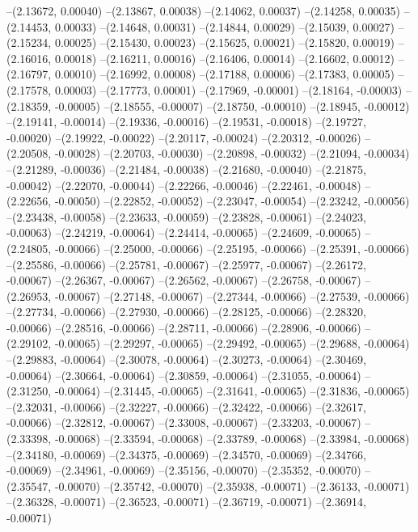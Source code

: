 --(2.13672, 0.00040)
--(2.13867, 0.00038)
--(2.14062, 0.00037)
--(2.14258, 0.00035)
--(2.14453, 0.00033)
--(2.14648, 0.00031)
--(2.14844, 0.00029)
--(2.15039, 0.00027)
--(2.15234, 0.00025)
--(2.15430, 0.00023)
--(2.15625, 0.00021)
--(2.15820, 0.00019)
--(2.16016, 0.00018)
--(2.16211, 0.00016)
--(2.16406, 0.00014)
--(2.16602, 0.00012)
--(2.16797, 0.00010)
--(2.16992, 0.00008)
--(2.17188, 0.00006)
--(2.17383, 0.00005)
--(2.17578, 0.00003)
--(2.17773, 0.00001)
--(2.17969, -0.00001)
--(2.18164, -0.00003)
--(2.18359, -0.00005)
--(2.18555, -0.00007)
--(2.18750, -0.00010)
--(2.18945, -0.00012)
--(2.19141, -0.00014)
--(2.19336, -0.00016)
--(2.19531, -0.00018)
--(2.19727, -0.00020)
--(2.19922, -0.00022)
--(2.20117, -0.00024)
--(2.20312, -0.00026)
--(2.20508, -0.00028)
--(2.20703, -0.00030)
--(2.20898, -0.00032)
--(2.21094, -0.00034)
--(2.21289, -0.00036)
--(2.21484, -0.00038)
--(2.21680, -0.00040)
--(2.21875, -0.00042)
--(2.22070, -0.00044)
--(2.22266, -0.00046)
--(2.22461, -0.00048)
--(2.22656, -0.00050)
--(2.22852, -0.00052)
--(2.23047, -0.00054)
--(2.23242, -0.00056)
--(2.23438, -0.00058)
--(2.23633, -0.00059)
--(2.23828, -0.00061)
--(2.24023, -0.00063)
--(2.24219, -0.00064)
--(2.24414, -0.00065)
--(2.24609, -0.00065)
--(2.24805, -0.00066)
--(2.25000, -0.00066)
--(2.25195, -0.00066)
--(2.25391, -0.00066)
--(2.25586, -0.00066)
--(2.25781, -0.00067)
--(2.25977, -0.00067)
--(2.26172, -0.00067)
--(2.26367, -0.00067)
--(2.26562, -0.00067)
--(2.26758, -0.00067)
--(2.26953, -0.00067)
--(2.27148, -0.00067)
--(2.27344, -0.00066)
--(2.27539, -0.00066)
--(2.27734, -0.00066)
--(2.27930, -0.00066)
--(2.28125, -0.00066)
--(2.28320, -0.00066)
--(2.28516, -0.00066)
--(2.28711, -0.00066)
--(2.28906, -0.00066)
--(2.29102, -0.00065)
--(2.29297, -0.00065)
--(2.29492, -0.00065)
--(2.29688, -0.00064)
--(2.29883, -0.00064)
--(2.30078, -0.00064)
--(2.30273, -0.00064)
--(2.30469, -0.00064)
--(2.30664, -0.00064)
--(2.30859, -0.00064)
--(2.31055, -0.00064)
--(2.31250, -0.00064)
--(2.31445, -0.00065)
--(2.31641, -0.00065)
--(2.31836, -0.00065)
--(2.32031, -0.00066)
--(2.32227, -0.00066)
--(2.32422, -0.00066)
--(2.32617, -0.00066)
--(2.32812, -0.00067)
--(2.33008, -0.00067)
--(2.33203, -0.00067)
--(2.33398, -0.00068)
--(2.33594, -0.00068)
--(2.33789, -0.00068)
--(2.33984, -0.00068)
--(2.34180, -0.00069)
--(2.34375, -0.00069)
--(2.34570, -0.00069)
--(2.34766, -0.00069)
--(2.34961, -0.00069)
--(2.35156, -0.00070)
--(2.35352, -0.00070)
--(2.35547, -0.00070)
--(2.35742, -0.00070)
--(2.35938, -0.00071)
--(2.36133, -0.00071)
--(2.36328, -0.00071)
--(2.36523, -0.00071)
--(2.36719, -0.00071)
--(2.36914, -0.00071)
